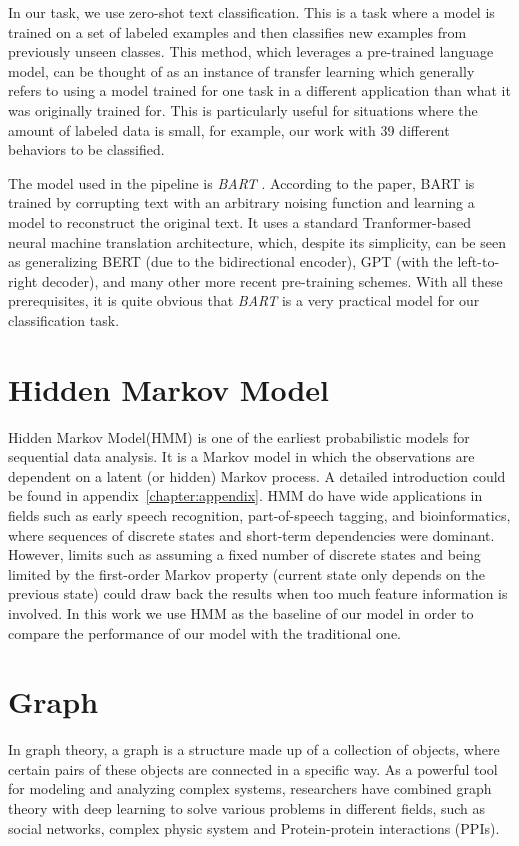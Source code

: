 In our task, we use zero-shot text classification. This is a task where a model is trained on a set of labeled examples and then classifies new examples from previously unseen classes. This method, which leverages a pre-trained language model, can be thought of as an instance of transfer learning which generally refers to using a model trained for one task in a different application than what it was originally trained for. This is particularly useful for situations where the amount of labeled data is small, for example, our work with 39 different behaviors to be classified.

The model used in the pipeline is \textit{BART} \cite{lewis2019bartdenoisingsequencetosequencepretraining}. According to the paper, BART is trained by corrupting text with an arbitrary noising function and learning a model to reconstruct the original text. It uses a standard Tranformer-based neural machine translation architecture, which, despite its simplicity, can be seen as generalizing BERT (due to the bidirectional encoder), GPT (with the left-to-right decoder), and many other more recent pre-training schemes. With all these prerequisites, it is quite obvious that \textit{BART} is a very practical model for our classification task.



\section{Hidden Markov Model}
Hidden Markov Model(HMM) \cite{rabiner1989tutorial,baum1972inequality} is one of the earliest probabilistic models for sequential data analysis. It is a Markov model in which the observations are dependent on a latent (or hidden) Markov process. A detailed introduction could be found in appendix~\ref{chapter:appendix}. HMM do have wide applications in fields such as early speech recognition, part-of-speech tagging, and bioinformatics, where sequences of discrete states and short-term dependencies were dominant. However, limits such as assuming a fixed number of discrete states and being limited by the first-order Markov property (current state only depends on the previous state) could draw back the results when too much feature information is involved. In this work we use HMM as the baseline of our model in order to compare the performance of our model with the traditional one.
\section{Graph}
\label{sec:graph}
In graph theory, a graph is a structure made up of a collection of objects, where certain pairs of these objects are connected in a specific way\cite{zhou2020graph}. As a powerful tool for modeling and analyzing complex systems, researchers have combined graph theory with deep learning to solve various problems in different fields, such as social networks\cite{wu2020graph}, complex physic system\cite{sanchez2018graph} and Protein-protein interactions (PPIs)\cite{NIPS2017_f5077839}.

